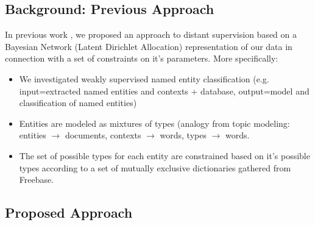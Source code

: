 \documentclass[12pt]{article}
\begin{document}
\subsection{Background: Previous Approach}
In previous work \cite{Ritter11}, we proposed an approach to distant supervision based on a Bayesian Network (Latent Dirichlet Allocation) representation of our data
in connection with a set of constraints on it's parameters.  More specifically:
\begin{itemize}
  \item We investigated weakly supervised named entity classification (e.g. input=extracted named entities and contexts + database, output=model and classification of named entities)
  \item Entities are modeled as mixtures of types (analogy from topic modeling: entities $\rightarrow$ documents, contexts $\rightarrow$ words, types $\rightarrow$ words.
  \item The set of possible types for each entity are constrained based on it's possible types according to a set of mutually exclusive dictionaries gathered from Freebase.
\end{itemize}

\subsection{Proposed Approach}


\end{document}
